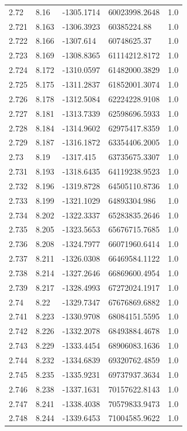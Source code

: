 \begin{tabular}{lllll}
2.72 & 8.16 & -1305.1714 & 60023998.2648 & 1.0 \\
2.721 & 8.163 & -1306.3923 & 60385224.88 & 1.0 \\
2.722 & 8.166 & -1307.614 & 60748625.37 & 1.0 \\
2.723 & 8.169 & -1308.8365 & 61114212.8172 & 1.0 \\
2.724 & 8.172 & -1310.0597 & 61482000.3829 & 1.0 \\
2.725 & 8.175 & -1311.2837 & 61852001.3074 & 1.0 \\
2.726 & 8.178 & -1312.5084 & 62224228.9108 & 1.0 \\
2.727 & 8.181 & -1313.7339 & 62598696.5933 & 1.0 \\
2.728 & 8.184 & -1314.9602 & 62975417.8359 & 1.0 \\
2.729 & 8.187 & -1316.1872 & 63354406.2005 & 1.0 \\
2.73 & 8.19 & -1317.415 & 63735675.3307 & 1.0 \\
2.731 & 8.193 & -1318.6435 & 64119238.9523 & 1.0 \\
2.732 & 8.196 & -1319.8728 & 64505110.8736 & 1.0 \\
2.733 & 8.199 & -1321.1029 & 64893304.986 & 1.0 \\
2.734 & 8.202 & -1322.3337 & 65283835.2646 & 1.0 \\
2.735 & 8.205 & -1323.5653 & 65676715.7685 & 1.0 \\
2.736 & 8.208 & -1324.7977 & 66071960.6414 & 1.0 \\
2.737 & 8.211 & -1326.0308 & 66469584.1122 & 1.0 \\
2.738 & 8.214 & -1327.2646 & 66869600.4954 & 1.0 \\
2.739 & 8.217 & -1328.4993 & 67272024.1917 & 1.0 \\
2.74 & 8.22 & -1329.7347 & 67676869.6882 & 1.0 \\
2.741 & 8.223 & -1330.9708 & 68084151.5595 & 1.0 \\
2.742 & 8.226 & -1332.2078 & 68493884.4678 & 1.0 \\
2.743 & 8.229 & -1333.4454 & 68906083.1636 & 1.0 \\
2.744 & 8.232 & -1334.6839 & 69320762.4859 & 1.0 \\
2.745 & 8.235 & -1335.9231 & 69737937.3634 & 1.0 \\
2.746 & 8.238 & -1337.1631 & 70157622.8143 & 1.0 \\
2.747 & 8.241 & -1338.4038 & 70579833.9473 & 1.0 \\
2.748 & 8.244 & -1339.6453 & 71004585.9622 & 1.0 \\

\end{tabular}
